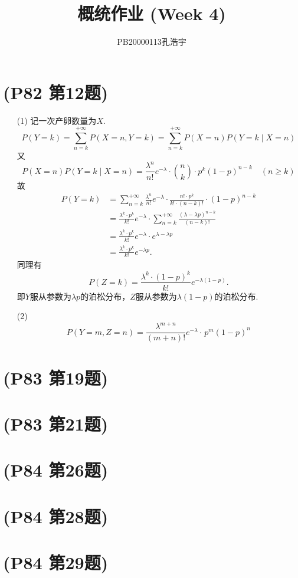 \documentclass{article}
\title{概统作业 (Week 4)}
\author{PB20000113孔浩宇}
\begin{document}
\maketitle
\section{(P82 第12题)}  %
\begin{enumerate}
    \item [(1)]记一次产卵数量为$X$.
    \[
        P(Y=k) 
        =
        \sum\limits_{n=k}^{+\infty} P(X=n , Y=k) 
        =
        \sum\limits_{n=k}^{+\infty} P(X=n) P(Y=k \mid X=n)
    \]
    又
    \[
        P(X=n) P(Y=k \mid X=n)
        =
        \displaystyle{\frac{\lambda^n}{n!}} e^{-\lambda}\cdot
        \binom{n}{k} \cdot p^{k} {(1-p)}^{n-k}
        \quad (n\geq k)
    \]
    故
    \begin{align*}
        P(Y=k)
        &=
        \sum\limits_{n=k}^{+\infty} 
        \displaystyle{\frac{\lambda^n}{n!}} e^{-\lambda}\cdot
        \displaystyle{\frac{n!\cdot p^{k}}{k!\cdot {(n-k)!}}} \cdot  {(1-p)}^{n-k} \\
        &=
        \displaystyle{\frac{\lambda^k \cdot p^{k}}{k!}} e^{-\lambda}\cdot
        \sum\limits_{n=k}^{+\infty} 
        \displaystyle{\frac{{(\lambda -\lambda p)}^{n-k}}{{(n-k)!}}}  \\
        &=
        \displaystyle{\frac{\lambda^k \cdot p^{k}}{k!}} e^{-\lambda}\cdot
        e^{\lambda - \lambda p}\\
        &=
        \displaystyle{\frac{\lambda^k \cdot p^{k}}{k!}} e^{-\lambda p} .
    \end{align*}
    同理有
    \[
        P(Z=k)
        =
        \displaystyle{\frac{\lambda^k \cdot {(1-p)}^{k}}{k!}} e^{-\lambda (1-p)} .
    \]
    即$Y$服从参数为$\lambda p$的泊松分布，$Z$服从参数为$\lambda (1-p)$的泊松分布.
    \item [(2)]
    \[
        P(Y=m,Z=n) 
        =
        \displaystyle{\frac{\lambda^{m+n}}{(m+n)!}} e^{-\lambda}\cdot
        \frac{}{} p^{m} {(1-p)}^{n}
    \]
\end{enumerate}

\section{(P83 第19题)}  %

\section{(P83 第21题)}  %

\section{(P84 第26题)}  %

\section{(P84 第28题)}  %

\section{(P84 第29题)}  %
\end{document}
